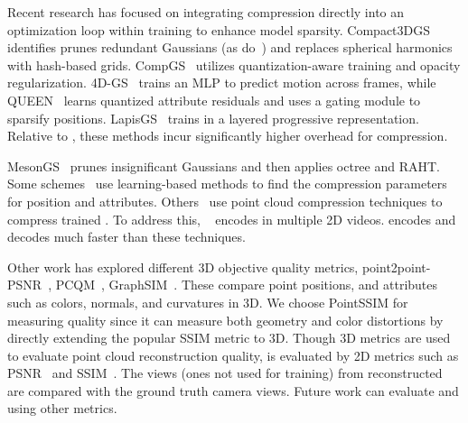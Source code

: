 Recent research has focused on integrating compression directly into an optimization loop within training to enhance model sparsity.
%
Compact3DGS~\cite{compact3dgs} identifies prunes redundant Gaussians (as do~\cite{recongs2025, scaffoldgs}) and replaces spherical harmonics with hash-based grids.
%
CompGS~\cite{compgs} utilizes quantization-aware training and opacity regularization.
%
4D-GS~\cite{4dgs} trains an MLP to predict motion across frames, while QUEEN~\cite{queen} learns quantized attribute residuals and uses a gating module to sparsify positions. 
%
%
LapisGS~\cite{shi2025lapisgs} trains \gs{} in a layered progressive representation.
%
Relative to \gsnfs{}, these methods incur significantly higher overhead for compression.

%
MesonGS~\cite{mesongs} prunes insignificant Gaussians and then applies octree and RAHT.
%
Some schemes~\cite{gauspcgc, entropygs} use learning-based methods to find the compression parameters for position and attributes.
%
Others~\cite{LTS, gpcc-adaptive} use point cloud compression techniques to compress trained \gs{}.
%
%
To address this, \vthree{}~\cite{v3volumetric} encodes \dgs{} in multiple 2D videos.
%
\gsnfs{} encodes and decodes much faster than these techniques.
%

%
Other work has explored different 3D objective quality metrics, point2point-PSNR~\cite{dong-tian}, PCQM~\cite{pcqm}, GraphSIM~\cite{graphsim}.
%
These compare point positions, and attributes such as colors, normals, and curvatures in 3D. 
%
We choose PointSSIM for measuring quality since it can measure both geometry and color distortions by directly extending the popular SSIM metric to 3D. 
%
Though 3D metrics are used to evaluate point cloud reconstruction quality, \gs is evaluated by 2D metrics such as PSNR~\cite{psnr} and SSIM~\cite{ssim}.
%
The views (ones not used for training) from reconstructed \gs are compared with the ground truth camera views.
%
Future work can evaluate \livo and \gsnfs using other metrics.
